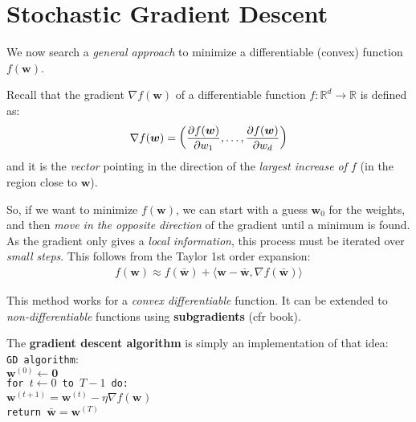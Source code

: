 \documentclass[../template.tex]{subfiles}
\begin{document}
\section{Stochastic Gradient Descent}
We now search a \textit{general approach} to minimize a differentiable (convex) function $f(\bm{w})$.

Recall that the gradient $\nabla f(\bm{w})$ of a differentiable function $f\colon \mathbb{R}^d \to \mathbb{R}$ is defined as:
\begin{align*}
    \nabla f(\bm{w}) = \left(\pdv{f(\bm{w})}{w_1}, \dots, \pdv{f(\bm{w})}{w_d}\right)
\end{align*}  
and it is the \textit{vector} pointing in the direction of the \textit{largest increase of $f$} (in the region close to $\bm{w}$). 

So, if we want to minimize $f(\bm{w})$, we can start with a guess $\bm{w}_0$ for the weights, and then \textit{move in the opposite direction} of the gradient until a minimum is found. As the gradient only gives a \textit{local information}, this process must be iterated over \textit{small steps}. This follows from the Taylor 1st order expansion:
\begin{align*}
    f(\bm{w}) \approx f(\bar{\bm{w}}) + \langle \bm{w} - \bar{\bm{w}}, \nabla f(\bar{\bm{w}}) \rangle 
\end{align*}   

This method works for a \textit{convex differentiable} function. It can be extended to \textit{non-differentiable} functions using \textbf{subgradients} (cfr book).

The \textbf{gradient descent algorithm} is simply an implementation of that idea:\\ 

\texttt{GD algorithm}:\\
$\bm{w}^{(0)} \leftarrow \bm{0}$\\
\texttt{for $t \leftarrow 0$ to $T - 1$ do:}\\
\texttt{$\bm{w}^{(t+1)} = \bm{w}^{(t)} - \eta \nabla f(\bm{w}^{})$ } \\
\texttt{return $\bar{\bm{w}} = \bm{w}^{(T)}$ }\\
\end{document}
